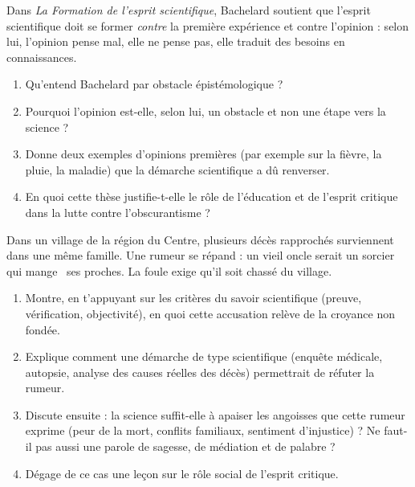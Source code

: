 \documentclass[11pt]{article}
\newcommand{\cle}[1]{{\popxbold\color{popdark}#1}}
\newcounter{popsec}
\newcounter{popsub}
\newcommand{\courssub}[1]{%
  \stepcounter{popsub}%
  \par\vspace{9pt}\noindent{\popxbold\fontsize{11.5}{13}\selectfont\color{popink}{\color{poporange}\thepopsec.\thepopsub}\hspace{6pt}#1}\par\nopagebreak\vspace{4pt}
}
\begin{document}
\begin{exercice}
Dans \emph{La Formation de l'esprit scientifique}, Bachelard soutient que l'esprit scientifique doit se former \emph{contre} la première expérience et contre l'opinion : selon lui, l'opinion pense mal, elle ne pense pas, elle traduit des besoins en connaissances.

\begin{enumerate}
\item Qu'entend Bachelard par \cle{obstacle épistémologique} ?
\item Pourquoi l'opinion est-elle, selon lui, un obstacle et non une étape vers la science ?
\item Donne deux exemples d'opinions premières (par exemple sur la fièvre, la pluie, la maladie) que la démarche scientifique a dû renverser.
\item En quoi cette thèse justifie-t-elle le rôle de l'éducation et de l'esprit critique dans la lutte contre l'obscurantisme ?
\end{enumerate}
\end{exercice}

\begin{exercice}
Dans un village de la région du Centre, plusieurs décès rapprochés surviennent dans une même famille. Une rumeur se répand : un vieil oncle serait un sorcier qui \guillemotleft mange \guillemotright\ ses proches. La foule exige qu'il soit chassé du village.

\begin{enumerate}
\item Montre, en t'appuyant sur les critères du savoir scientifique (preuve, vérification, objectivité), en quoi cette accusation relève de la croyance non fondée.
\item Explique comment une démarche de type scientifique (enquête médicale, autopsie, analyse des causes réelles des décès) permettrait de réfuter la rumeur.
\item Discute ensuite : la science suffit-elle à apaiser les angoisses que cette rumeur exprime (peur de la mort, conflits familiaux, sentiment d'injustice) ? Ne faut-il pas aussi une parole de sagesse, de médiation et de palabre ?
\item Dégage de ce cas une leçon sur le rôle social de l'esprit critique.
\end{enumerate}
\end{exercice}

\courssub{Je me prépare au Bac}
\end{document}
